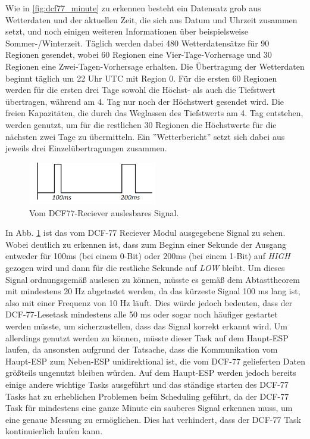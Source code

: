 \documentclass[12pt,a4paper,bibliography=totocnumbered,listof=totocnumbered]{article}
\begin{document}
Wie in \autoref{fig:dcf77_minute} zu erkennen besteht ein Datensatz grob aus Wetterdaten und der aktuellen Zeit, die sich aus Datum und Uhrzeit zusammen setzt, und noch einigen weiteren Informationen über beispielsweise Sommer-/Winterzeit.
Täglich werden dabei 480 Wetterdatensätze für 90 Regionen gesendet, wobei 60 Regionen eine Vier-Tage-Vorhersage und 30 Regionen eine Zwei-Tagen-Vorhersage erhalten. Die Übertragung der Wetterdaten beginnt täglich um 22 Uhr UTC mit Region 0. Für die ersten 60 Regionen werden für die ersten drei Tage sowohl die Höchst- als auch die Tiefstwert übertragen, während am 4. Tag nur noch der Höchstwert gesendet wird. Die freien Kapazitäten, die durch das Weglassen des Tiefstwerts am 4. Tag entstehen, werden genutzt, um für die restlichen 30 Regionen die Höchstwerte für die nächsten zwei Tage zu übermitteln. Ein ''Wetterbericht'' setzt sich dabei aus jeweils drei Einzelübertragungen zusammen. \cite{dcf77_wetter}
\begin{figure}[htpb] %
    \centering
    \includegraphics[width=0.5\textwidth,keepaspectratio=true]{pics/dcf77_signal.png}
    \caption{Vom DCF77-Reciever auslesbares Signal. \cite{dcf77_logs}}
    \label{fig:dcf77_signal}
\end{figure}
In Abb. \ref{fig:dcf77_signal} ist das vom DCF-77 Reciever Modul ausgegebene Signal zu sehen. Wobei deutlich zu erkennen ist, dass zum Beginn einer Sekunde der Ausgang entweder für 100ms (bei einem 0-Bit) oder 200ms (bei einem 1-Bit) auf \textit{HIGH} gezogen wird und dann für die restliche Sekunde auf \textit{LOW} bleibt. Um dieses Signal ordnungsgemäß auslesen zu können, müsste es gemäß dem Abtasttheorem mit mindestens 20 Hz abgetastet werden, da das kürzeste Signal 100 ms lang ist, also mit einer Frequenz von 10 Hz läuft. Dies würde jedoch bedeuten, dass der DCF-77-Lesetask mindestens alle 50 ms oder sogar noch häufiger gestartet werden müsste, um sicherzustellen, dass das Signal korrekt erkannt wird. Um allerdings genutzt werden zu können, müsste dieser Task auf dem Haupt-ESP laufen, da ansonsten aufgrund der Tatsache, dass die Kommunikation vom Haupt-ESP zum Neben-ESP unidirektional ist, die vom DCF-77 gelieferten Daten größteils ungenutzt bleiben würden. Auf dem Haupt-ESP werden jedoch bereits einige andere wichtige Tasks ausgeführt und das ständige starten des DCF-77 Tasks hat zu erheblichen Problemen beim Scheduling geführt, da der DCF-77 Task für mindestens eine ganze Minute ein sauberes Signal erkennen muss, um eine genaue Messung zu ermöglichen. Dies hat verhindert, dass der DCF-77 Task kontinuierlich laufen kann. 
\end{document}
